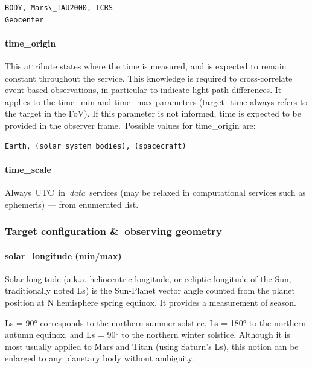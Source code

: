 \documentclass[11pt,a4paper]{ivoa}
\begin{document}
\begin{verbatim}BODY, Mars\_IAU2000, ICRS
Geocenter \end{verbatim}




\paragraph{time\_origin}

This attribute states where the time is measured, and is expected to remain constant throughout the service. This knowledge is required to cross-correlate event-based observations, in particular to indicate light-path differences. It applies to the time\_min and time\_max parameters (target\_time always refers to the target in the FoV). If this parameter is not informed, time is expected to be provided in the observer frame. Possible values for time\_origin are:






\begin{verbatim}Earth, (solar system bodies), (spacecraft)\end{verbatim}




\paragraph{time\_scale}

Always UTC in \emph{data} services (may be relaxed in computational services such as ephemeris) — from enumerated list.

\subsubsection{Target configuration \& observing geometry}

\paragraph{solar\_longitude (min/max)}

Solar longitude (a.k.a. heliocentric longitude, or ecliptic longitude of the Sun, traditionally noted Ls) is the Sun-Planet vector angle counted from the planet position at N hemisphere spring equinox. It provides a measurement of season.

Ls = 90° corresponds to the northern summer solstice, Ls = 180° to the northern autumn equinox, and Ls = 90° to the northern winter solstice. Although it is most usually applied to Mars and Titan (using Saturn's Ls), this notion can be enlarged to any planetary body without ambiguity.
\end{document}

